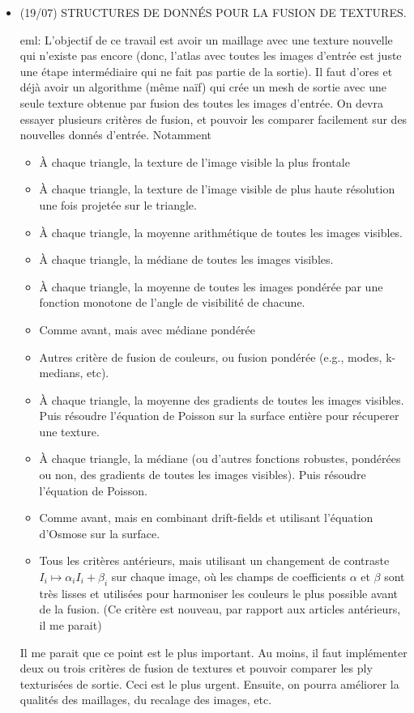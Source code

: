 \documentclass{article}
\newcommand{\mnhrdt}[1]{{\footnotesize\textcolor[rgb]{0.8,0.5,0.5}{eml: #1}}}
\begin{document}
\begin{itemize}
\item (19/07) STRUCTURES DE DONNÉS POUR LA FUSION DE TEXTURES.  
\mnhrdt{L'objectif de ce
travail est avoir un maillage avec une texture nouvelle qui n'existe
pas encore (donc, l'atlas avec toutes les images d'entrée est
juste une étape intermédiaire qui ne fait pas partie de la
sortie).  Il faut d'ores et déjà avoir un algorithme (même
naïf) qui crée un mesh de sortie avec une seule texture
obtenue par fusion des toutes les images d'entrée.  On devra
essayer plusieurs critères de fusion, et pouvoir les comparer
facilement sur des nouvelles donnés d'entrée.  Notamment
\begin{itemize}
	\item À chaque triangle, la texture de l'image visible la plus frontale
	\item À chaque triangle, la texture de l'image visible de plus haute
		résolution une fois projetée sur le triangle.
	\item À chaque triangle, la moyenne arithmétique de toutes les
		images visibles.
	\item À chaque triangle, la médiane de toutes les images visibles.
	\item À chaque triangle, la moyenne de toutes les images pondérée par
		une fonction monotone de l'angle de visibilité de chacune.
	\item Comme avant, mais avec médiane pondérée
	\item Autres critère de fusion de couleurs, ou fusion pondérée (e.g.,
		modes, k-medians, etc).
	\item À chaque triangle, la moyenne des gradients de toutes les
		images visibles.  Puis résoudre l'équation de Poisson sur la
		surface entière pour récuperer une texture.
	\item À chaque triangle, la médiane (ou d'autres fonctions robustes,
		pondérées ou non,  des gradients de toutes les images
		visibles).  Puis résoudre l'équation de Poisson.
	\item Comme avant, mais en combinant drift-fields et utilisant
		l'équation d'Osmose sur la surface.
	\item Tous les critères antérieurs, mais utilisant un changement de
		contraste~$I_i\mapsto\alpha_i I_i+\beta_i$ sur chaque image,
		où les champs de coefficients $\alpha$ et $\beta$ sont très
		lisses et utilisées pour harmoniser les couleurs le plus
		possible avant de la fusion.  (Ce critère est nouveau, par
		rapport aux articles antérieurs, il me parait)
\end{itemize}
Il me parait que ce point est le plus important.  Au moins, il faut implémenter deux ou trois critères de fusion de
textures et pouvoir comparer les ply texturisées de sortie.  Ceci est le plus
urgent.  Ensuite, on pourra améliorer la qualités des maillages, du recalage
des images, etc.}
\end{itemize}
\end{document}
